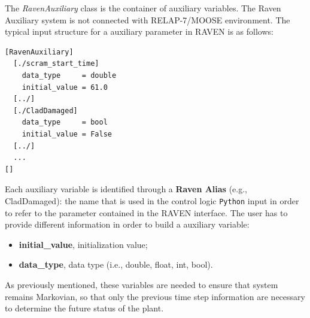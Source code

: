 \documentclass{mc2013}
\begin{document}
The \emph{RavenAuxiliary} class is the container of auxiliary variables. The Raven Auxiliary system is not connected with RELAP-7/MOOSE environment. The typical input structure for a auxiliary parameter in RAVEN is as follows:
\begin{lstlisting}
[RavenAuxiliary]
  [./scram_start_time]
    data_type     = double
    initial_value = 61.0
  [../]
  [./CladDamaged]
    data_type     = bool
    initial_value = False
  [../]  
  ...
[]
\end{lstlisting}
Each auxiliary variable is identified through a \textbf{Raven Alias} (e.g., CladDamaged): the name that is used in the control logic \verb!Python! input in order to refer to the parameter contained in the RAVEN interface.
The user has to provide different information in order to build a auxiliary variable:
\begin{itemize}
  \item \textbf{initial\_value}, initialization value;
  \item \textbf{data\_type}, data type (i.e., double, float, int, bool).
\end{itemize}
As previously mentioned, these variables are needed to ensure that system remains Markovian, so that only the previous time step information are necessary to determine the future status of the plant. 
\end{document}
